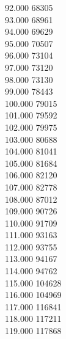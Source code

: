 { 92.000	68305 \\
 93.000	68961 \\
 94.000	69629 \\
 95.000	70507 \\
 96.000	73104 \\
 97.000	73120 \\
 98.000	73130 \\
 99.000	78443 \\
 100.000	79015 \\
 101.000	79592 \\
 102.000	79975 \\
 103.000	80688 \\
 104.000	81041 \\
 105.000	81684 \\
 106.000	82120 \\
 107.000	82778 \\
 108.000	87012 \\
 109.000	90726 \\
 110.000	91709 \\
 111.000	93163 \\
 112.000	93755 \\
 113.000	94167 \\
 114.000	94762 \\
 115.000	104628 \\
 116.000	104969 \\
 117.000	116841 \\
 118.000	117211 \\
 119.000	117868 \\
}
